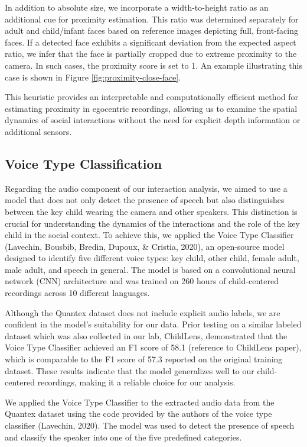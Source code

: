 \documentclass[
  man,floatsintext]{apa6}
\begin{document}
In addition to absolute size, we incorporate a width-to-height ratio as an additional cue for proximity estimation. This ratio was determined separately for adult and child/infant faces based on reference images depicting full, front-facing faces. If a detected face exhibits a significant deviation from the expected aspect ratio, we infer that the face is partially cropped due to extreme proximity to the camera. In such cases, the proximity score is set to 1. An example illustrating this case is shown in Figure \ref{fig:proximity-close-face}.

This heuristic provides an interpretable and computationally efficient method for estimating proximity in egocentric recordings, allowing us to examine the spatial dynamics of social interactions without the need for explicit depth information or additional sensors.

\subsection{Voice Type Classification}\label{voice-type-classification}

Regarding the audio component of our interaction analysis, we aimed to use a model that does not only detect the presence of speech but also distinguishes between the key child wearing the camera and other speakers. This distinction is crucial for understanding the dynamics of the interactions and the role of the key child in the social context. To achieve this, we applied the Voice Type Classifier (Lavechin, Bousbib, Bredin, Dupoux, \& Cristia, 2020), an open-source model designed to identify five different voice types: key child, other child, female adult, male adult, and speech in general. The model is based on a convolutional neural network (CNN) architecture and was trained on 260 hours of child-centered recordings across 10 different languages.

Although the Quantex dataset does not include explicit audio labels, we are confident in the model's suitability for our data. Prior testing on a similar labeled dataset which was also collected in our lab, ChildLens, demonstrated that the Voice Type Classifier achieved an F1 score of 58.1 (reference to ChildLens paper), which is comparable to the F1 score of 57.3 reported on the original training dataset. These results indicate that the model generalizes well to our child-centered recordings, making it a reliable choice for our analysis.

We applied the Voice Type Classifier to the extracted audio data from the Quantex dataset using the code provided by the authors of the voice type classifier (Lavechin, 2020). The model was used to detect the presence of speech and classify the speaker into one of the five predefined categories.
\end{document}
